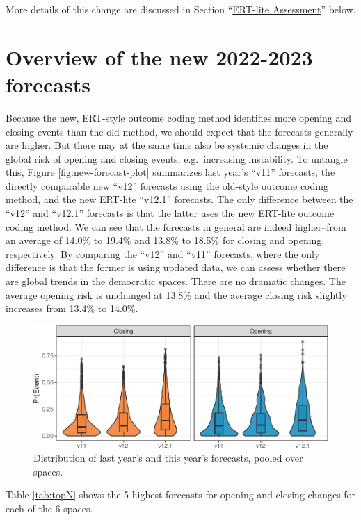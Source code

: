 \documentclass[
  11pt,
]{article}
\begin{document}
More details of this change are discussed in Section
``\href{ert-lite-assessment}{ERT-lite Assessment}'' below.

\hypertarget{overview-of-the-new-2022-2023-forecasts}{%
\section{Overview of the new 2022-2023
forecasts}\label{overview-of-the-new-2022-2023-forecasts}}

Because the new, ERT-style outcome coding method identifies more opening
and closing events than the old method, we should expect that the
forecasts generally are higher. But there may at the same time also be
systemic changes in the global risk of opening and closing events,
e.g.~increasing instability. To untangle this, Figure
\ref{fig:new-forecast-plot} summarizes last year's ``v11'' forecasts,
the directly comparable new ``v12'' forecasts using the old-style
outcome coding method, and the new ERT-lite ``v12.1'' forecasts. The
only difference between the ``v12'' and ``v12.1'' forecasts is that the
latter uses the new ERT-lite outcome coding method. We can see that the
forecasts in general are indeed higher--from an average of 14.0\% to
19.4\% and 13.8\% to 18.5\% for closing and opening, respectively. By
comparing the ``v12'' and ``v11'' forecasts, where the only difference
is that the former is using updated data, we can assess whether there
are global trends in the democratic spaces. There are no dramatic
changes. The average opening risk is unchanged at 13.8\% and the average
closing risk slightly increases from 13.4\% to 14.0\%.

\begin{figure}
\centering
\includegraphics{democratic-spaces-2022_files/figure-latex/new-forecast-plot-1.pdf}
\caption{Distribution of last year's and this year's forecasts, pooled
over spaces.}
\end{figure}

Table \ref{tab:topN} shows the 5 highest forecasts for opening and
closing changes for each of the 6 spaces.
\end{document}
